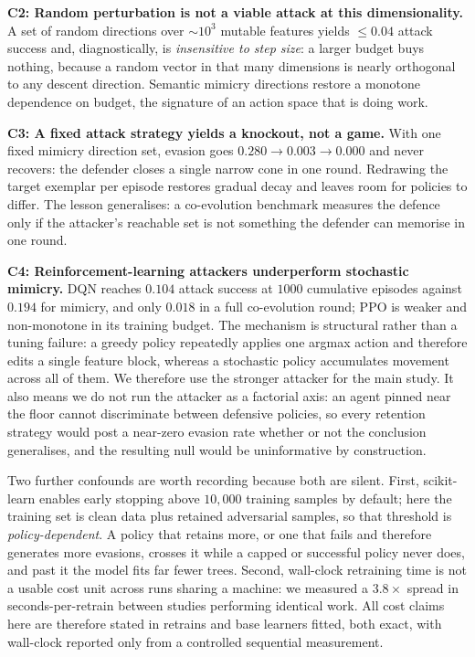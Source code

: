 \documentclass[conference]{IEEEtran}
\begin{document}
\textbf{C2: Random perturbation is not a viable attack at this
dimensionality.} A set of random directions over ${\sim}10^3$ mutable features
yields ${\le}0.04$ attack success and, diagnostically, is \emph{insensitive to
step size}: a larger budget buys nothing, because a random vector in that many
dimensions is nearly orthogonal to any descent direction. Semantic mimicry
directions restore a monotone dependence on budget, the signature of an action
space that is doing work.

\textbf{C3: A fixed attack strategy yields a knockout, not a game.} With one
fixed mimicry direction set, evasion goes
$0.280\rightarrow0.003\rightarrow0.000$ and never recovers: the defender closes
a single narrow cone in one round. Redrawing the target exemplar per episode
restores gradual decay and leaves room for policies to differ. The lesson
generalises: a co-evolution benchmark measures the defence only if the
attacker's reachable set is not something the defender can memorise in one
round.

\textbf{C4: Reinforcement-learning attackers underperform stochastic mimicry.}
DQN reaches $0.104$ attack success at $1000$ cumulative episodes against
$0.194$ for mimicry, and only $0.018$ in a full co-evolution round; PPO is
weaker and non-monotone in its training budget. The mechanism is structural
rather than a tuning failure: a greedy policy repeatedly applies one argmax
action and therefore edits a single feature block, whereas a stochastic policy
accumulates movement across all of them. We therefore use the stronger attacker
for the main study. It also means we do not run the attacker as a factorial
axis: an agent pinned near the floor cannot discriminate between defensive
policies, so every retention strategy would post a near-zero evasion rate
whether or not the conclusion generalises, and the resulting null would be
uninformative by construction.

Two further confounds are worth recording because both are silent. First,
scikit-learn enables early stopping above $10{,}000$ training samples by
default; here the training set is clean data plus retained adversarial samples,
so that threshold is \emph{policy-dependent}. A policy that retains more, or
one that fails and therefore generates more evasions, crosses it while a capped
or successful policy never does, and past it the model fits far fewer trees.
Second, wall-clock retraining time is not a usable cost unit across runs
sharing a machine: we measured a $3.8\times$ spread in seconds-per-retrain
between studies performing identical work. All cost claims here are therefore
stated in retrains and base learners fitted, both exact, with wall-clock
reported only from a controlled sequential measurement.
\end{document}
